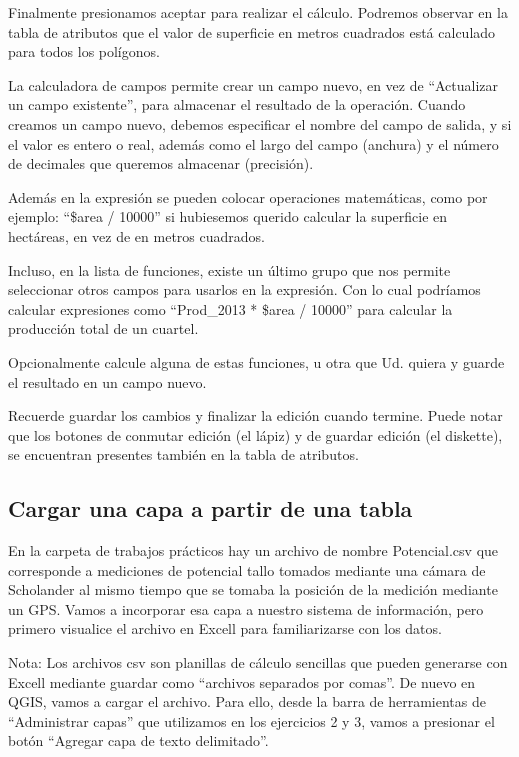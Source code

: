 \documentclass[]{article}
\begin{document}
Finalmente presionamos aceptar para realizar el cálculo. Podremos observar en la tabla de atributos que el valor de superficie en metros cuadrados está calculado para todos los polígonos.

La calculadora de campos permite crear un campo nuevo, en vez de “Actualizar un campo existente”, para almacenar el resultado de la operación. Cuando creamos un campo nuevo, debemos especificar el nombre del campo de salida, y si el valor es entero o real, además como el largo del campo (anchura) y el número de decimales que queremos almacenar (precisión). 

Además en la expresión se pueden colocar operaciones matemáticas, como por ejemplo: “\$area / 10000” si hubiesemos querido calcular la superficie en hectáreas, en vez de en metros cuadrados. 

Incluso, en la lista de funciones, existe un último grupo que nos permite seleccionar otros campos para usarlos en la expresión. Con lo cual podríamos calcular expresiones como “Prod\_2013 * \$area / 10000” para calcular la producción total de un cuartel. 

Opcionalmente calcule alguna de estas funciones, u otra que Ud. quiera y guarde el resultado en un campo nuevo.

Recuerde guardar los cambios y finalizar la edición cuando termine. Puede notar que los botones de conmutar edición (el lápiz) y de guardar edición (el diskette), se encuentran presentes también en la tabla de atributos.

\subsection{Cargar una capa a partir de una tabla}

En la carpeta de trabajos prácticos hay un archivo de nombre Potencial.csv que corresponde a mediciones de potencial tallo tomados mediante una cámara de Scholander al mismo tiempo que se tomaba la posición de la medición mediante un GPS. Vamos a incorporar esa capa a nuestro sistema de información, pero primero visualice el archivo en Excell para familiarizarse con los datos. 

Nota: Los archivos csv son planillas de cálculo sencillas que pueden generarse con Excell mediante guardar como “archivos separados por comas”.
De nuevo en QGIS, vamos a cargar el archivo. Para ello, desde la barra de herramientas de “Administrar capas” que utilizamos en los ejercicios 2 y 3, vamos a presionar el botón “Agregar capa de texto delimitado”.
\end{document}
